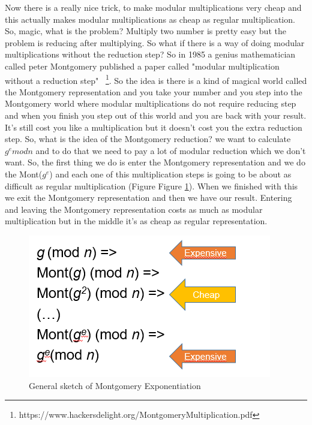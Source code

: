 Now there is a really nice trick, to make modular multiplications very cheap and this actually makes modular multiplications as cheap as regular multiplication. So, magic, what is the problem? Multiply two number is pretty easy but the problem is reducing after multiplying. So what if there is a way of doing modular multiplications without the reduction step? So in 1985 a genius mathematician called peter Montgomery published a paper called "modular multiplication without a reduction step" ~\cite{warren2013hacker}\footnote{https://www.hackersdelight.org/MontgomeryMultiplication.pdf}. So the idea is there is a kind of magical world called the Montgomery representation and you take your number and you step into the Montgomery world where modular multiplications do not require reducing step and when you finish you step out of this world and you are back with your result. It’s still cost you like a multiplication but it doesn’t cost you the extra reduction step.
So, what is the idea of the Montgomery reduction? we want to calculate \(g^emodn\) and to do that we need to pay a lot of modular reduction which we  don’t want. So, the first thing we do is enter the Montgomery representation and we do the Mont(\(g^e\)) and each one of this multiplication steps is going to be about as difficult as regular multiplication (Figure Figure \ref{montg:fig}). When we  finished with this we exit the Montgomery representation and then we have our result. Entering and leaving the Montgomery representation costs as much as modular multiplication but in the middle it's as cheap as regular representation.

\begin{figure}[H]
    \centering
    \includegraphics[scale=0.7]{images/montg.PNG}
    \caption{General sketch of Montgomery Exponentiation} \label{montg:fig}
\end{figure}

